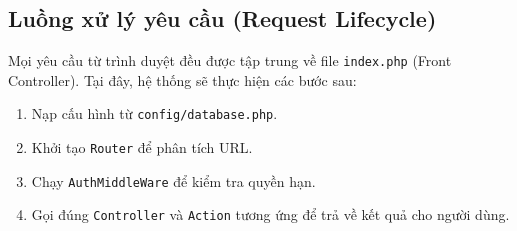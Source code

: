 \subsection{Luồng xử lý yêu cầu (Request Lifecycle)}
Mọi yêu cầu từ trình duyệt đều được tập trung về file \texttt{index.php} (Front Controller). Tại đây, hệ thống sẽ thực hiện các bước sau:
\begin{enumerate}
    \item Nạp cấu hình từ \texttt{config/database.php}.
    \item Khởi tạo \texttt{Router} để phân tích URL.
    \item Chạy \texttt{AuthMiddleWare} để kiểm tra quyền hạn.
    \item Gọi đúng \texttt{Controller} và \texttt{Action} tương ứng để trả về kết quả cho người dùng.
\end{enumerate}
